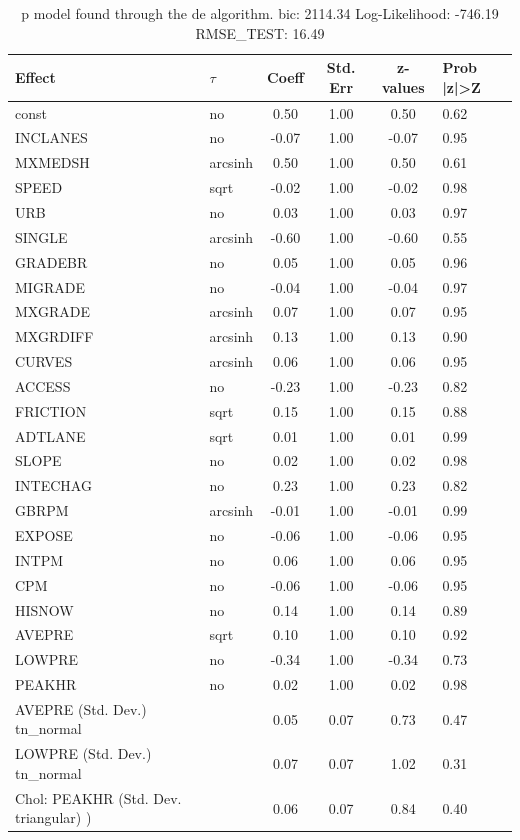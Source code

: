 \begin{table}
	\caption{p model found through the de algorithm. bic: 2114.34 Log-Likelihood: -746.19 RMSE_TEST: 16.49}
	\begin{center}
		\begin{tabular}{|l|l|c|c|c|l|}
			\hline
			Effect & $\tau$ & Coeff & Std. Err & z-values & Prob |z|>Z \\
			\hline
			const & no & 0.50 & 1.00 & 0.50 & 0.62 \\
			\hline
			INCLANES & no & -0.07 & 1.00 & -0.07 & 0.95 \\
			\hline
			MXMEDSH & arcsinh & 0.50 & 1.00 & 0.50 & 0.61 \\
			\hline
			SPEED & sqrt & -0.02 & 1.00 & -0.02 & 0.98 \\
			\hline
			URB & no & 0.03 & 1.00 & 0.03 & 0.97 \\
			\hline
			SINGLE & arcsinh & -0.60 & 1.00 & -0.60 & 0.55 \\
			\hline
			GRADEBR & no & 0.05 & 1.00 & 0.05 & 0.96 \\
			\hline
			MIGRADE & no & -0.04 & 1.00 & -0.04 & 0.97 \\
			\hline
			MXGRADE & arcsinh & 0.07 & 1.00 & 0.07 & 0.95 \\
			\hline
			MXGRDIFF & arcsinh & 0.13 & 1.00 & 0.13 & 0.90 \\
			\hline
			CURVES & arcsinh & 0.06 & 1.00 & 0.06 & 0.95 \\
			\hline
			ACCESS & no & -0.23 & 1.00 & -0.23 & 0.82 \\
			\hline
			FRICTION & sqrt & 0.15 & 1.00 & 0.15 & 0.88 \\
			\hline
			ADTLANE & sqrt & 0.01 & 1.00 & 0.01 & 0.99 \\
			\hline
			SLOPE & no & 0.02 & 1.00 & 0.02 & 0.98 \\
			\hline
			INTECHAG & no & 0.23 & 1.00 & 0.23 & 0.82 \\
			\hline
			GBRPM & arcsinh & -0.01 & 1.00 & -0.01 & 0.99 \\
			\hline
			EXPOSE & no & -0.06 & 1.00 & -0.06 & 0.95 \\
			\hline
			INTPM & no & 0.06 & 1.00 & 0.06 & 0.95 \\
			\hline
			CPM & no & -0.06 & 1.00 & -0.06 & 0.95 \\
			\hline
			HISNOW & no & 0.14 & 1.00 & 0.14 & 0.89 \\
			\hline
			AVEPRE & sqrt & 0.10 & 1.00 & 0.10 & 0.92 \\
			\hline
			LOWPRE & no & -0.34 & 1.00 & -0.34 & 0.73 \\
			\hline
			PEAKHR & no & 0.02 & 1.00 & 0.02 & 0.98 \\
			\hline
			AVEPRE (Std. Dev.) tn_normal &  & 0.05 & 0.07 & 0.73 & 0.47 \\
			\hline
			LOWPRE (Std. Dev.) tn_normal &  & 0.07 & 0.07 & 1.02 & 0.31 \\
			\hline
			 Chol: PEAKHR (Std. Dev. triangular) ) &  & 0.06 & 0.07 & 0.84 & 0.40 \\
			\hline
		\end{tabular}
	\end{center}
\end{table}